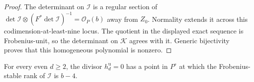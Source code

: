 \begin{proof}
The determinant on $\mathcal I$ is a regular section of
$\det\mathcal I\otimes(F^*\det\mathcal I)^{-1}
=\mathcal O_P(b)$ away from $Z_0$.
Normality extends it across this codimension-at-least-nine locus.
The quotient in the displayed exact sequence is Frobenius-unit,
so the determinant on $\mathcal K$ agrees with it. Generic
bijectivity proves that this homogeneous polynomial is nonzero.
\end{proof}

\begin{lemma}
\label{lem:ss-even-one-loss-point-candidate}
For every even $d\ge2$, the divisor $h_d^{\mathrm u}=0$ has a
point in $P^\circ$ at which the Frobenius-stable rank of
$\mathcal I$ is $b-4$.
\end{lemma}


